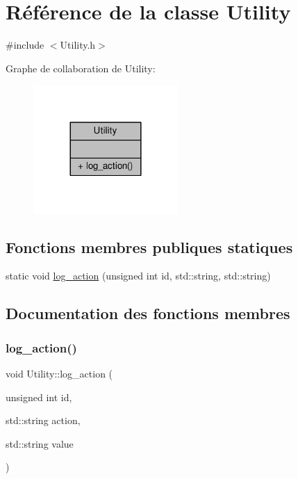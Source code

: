 \hypertarget{classUtility}{}\section{Référence de la classe Utility}
\label{classUtility}


{\ttfamily \#include $<$Utility.\+h$>$}



Graphe de collaboration de Utility\+:
\nopagebreak
\begin{figure}[H]
\begin{center}
\leavevmode
\includegraphics[width=156pt]{classUtility__coll__graph}
\end{center}
\end{figure}
\subsection*{Fonctions membres publiques statiques}
\begin{DoxyCompactItemize}
\item 
static void \hyperlink{classUtility_ad60c39b61fe45ce689004b818c4b6e2b}{log\+\_\+action} (unsigned int id, std\+::string, std\+::string)
\end{DoxyCompactItemize}


\subsection{Documentation des fonctions membres}
\mbox{\label{classUtility_ad60c39b61fe45ce689004b818c4b6e2b}} 
\subsubsection{\texorpdfstring{log\+\_\+action()}{log\_action()}}
{\footnotesize\ttfamily void Utility\+::log\+\_\+action (\begin{DoxyParamCaption}\item[{unsigned int}]{id,  }\item[{std\+::string}]{action,  }\item[{std\+::string}]{value }\end{DoxyParamCaption})\hspace{0.3cm}{\ttfamily [static]}}

